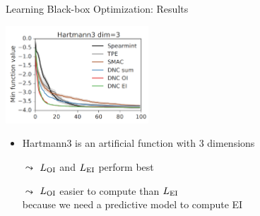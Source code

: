 \begin{frame}[c]{Learning Black-box Optimization: Results\newline {}}

\centering
\includegraphics[width=0.4\textwidth]{images/l2bo_hartmann3}

\begin{itemize}
\item Hartmann3 is an artificial function with 3 dimensions
\pause
\item[$\leadsto$] $L_{\text{OI}}$ and $L_{\text{EI}}$ perform best
\item[$\leadsto$] $L_{\text{OI}}$ easier to compute than $L_{\text{EI}}$\\ because we need a predictive model to compute EI 
\end{itemize}

\end{frame}



